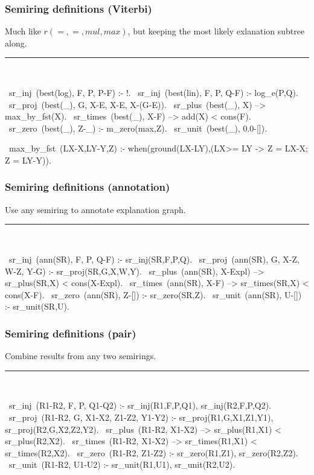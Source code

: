 \documentclass[usenames,dvipsnames]{beamer}
\newenvironment{isframe}[1][untitled]{\begin{frame}[fragile=singleslide,environment=isframe]\frametitle{#1}}{\end{frame}}
\begin{document}
\begin{isframe}[Semiring definitions (Viterbi)]
  Much like $r(=,=,mul,max)$, but keeping the most likely exlanation
  subtree along.
  \rule{\linewidth}{0.4pt}\\
  \begin{prolog}[xleftmargin=0em,deletekeywords={ground},basicstyle=\small]
  ~sr_inj~(best(log), F, P, P-F) :- !.
  ~sr_inj~(best(lin), F, P, Q-F)   :- log_e(P,Q).
  ~sr_proj~(best(_),  G, X-E, X-E, X-(G-E)).
  ~sr_plus~(best(_),  X) --> max_by_fst(X).
  ~sr_times~(best(_),  X-F) --> add(X) <\> cons(F).
  ~sr_zero~(best(_),  Z-_)   :- m_zero(max,Z).
  ~sr_unit~(best(_),  0.0-[]).

  ~max_by_fst~(LX-X,LY-Y,Z) :-
    when(ground(LX-LY),(LX>= LY -> Z = LX-X; Z = LY-Y)).
\end{prolog}
\end{isframe}

\begin{isframe}[Semiring definitions (annotation)]
Use any semiring to annotate explanation graph.
\rule{\linewidth}{0.4pt}\\
\begin{prolog}[xleftmargin=0em,basicstyle=\small]
  ~sr_inj~(ann(SR),   F, P, Q-F)   :- sr_inj(SR,F,P,Q).
  ~sr_proj~(ann(SR),  G, X-Z, W-Z, Y-G)     :- sr_proj(SR,G,X,W,Y).
  ~sr_plus~(ann(SR),  X-Expl) --> sr_plus(SR,X) <\> cons(X-Expl).
  ~sr_times~(ann(SR),  X-F) --> sr_times(SR,X) <\> cons(X-F).
  ~sr_zero~(ann(SR),  Z-[])  :- sr_zero(SR,Z).
  ~sr_unit~(ann(SR),  U-[])  :- sr_unit(SR,U).
\end{prolog}
\end{isframe}

\begin{isframe}[Semiring definitions (pair)]
Combine results from any two semirings.
\rule{\linewidth}{0.4pt}\\
\begin{prolog}[xleftmargin=0em,basicstyle=\small]
  ~sr_inj~(R1-R2, F, P, Q1-Q2) :- sr_inj(R1,F,P,Q1), sr_inj(R2,F,P,Q2).
  ~sr_proj~(R1-R2, G, X1-X2, Z1-Z2, Y1-Y2) :-
    sr_proj(R1,G,X1,Z1,Y1), sr_proj(R2,G,X2,Z2,Y2).
  ~sr_plus~(R1-R2, X1-X2) --> sr_plus(R1,X1) <\> sr_plus(R2,X2).
  ~sr_times~(R1-R2, X1-X2) --> sr_times(R1,X1) <\> sr_times(R2,X2).
  ~sr_zero~(R1-R2, Z1-Z2) :- sr_zero(R1,Z1), sr_zero(R2,Z2).
  ~sr_unit~(R1-R2, U1-U2) :- sr_unit(R1,U1), sr_unit(R2,U2).
\end{prolog}
\end{isframe}
\end{document}
